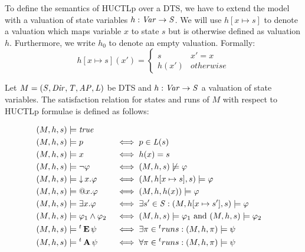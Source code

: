 To define the semantics of \ac{HUCTLp} over a \ac{DTS}, we have to extend the model with a valuation of state variables $h : \mathit{Var} \to \mathit{S}$. We will use $h[x \mapsto s]$ to denote a valuation which maps variable $x$ to state $s$ but is otherwise defined as valuation $h$. Furthermore, we write $h_0$ to denote an empty valuation. Formally:
\[
	h[x \mapsto s](x') = \begin{cases}
		s & x' = x \\
		h(x') & otherwise
	\end{cases}
\]

Let $M = (\mathit{S}, \mathit{Dir}, \mathit{T}, \mathit{AP}, \mathit{L})$ be \ac{DTS} and $h : \mathit{Var} \to \mathit{S}$ a valuation of state variables. The satisfaction relation for states and runs of $M$ with respect to \ac{HUCTLp} formulae is defined as follows:

\begin{alignat*}{2}
	(M,h,s) &\models \mathit{true}	\\
	(M,h,s) &\models p										   && \iff p \in \mathit{L}(s) \\
	(M,h,s) &\models x										   && \iff h(x) = s \\
	(M,h,s) &\models \neg \varphi  						  && \iff (M, h,s) \not\models \varphi \\
	(M,h,s) &\models \operatorname{\downarrow} x. \varphi 			   && \iff (M,h[x \mapsto s], s) \models \varphi \\
	(M,h,s) &\models \operatorname{@\!} x. \varphi 				&& \iff (M,h,h(x)) \models \varphi \\
	(M,h,s) &\models \exists x. \varphi 		  && \iff \exists s' \in \mathit{S} :  (M,h[x \mapsto s'], s) \models \varphi \\	
	(M,h,s) &\models \varphi_1 \land \varphi_2 	   && \iff (M,h,s) \models \varphi_1 \text{ and } (M,h,s) \models \varphi_2  \\
	(M,h,s) &\models {}^{t}\operatorname{\mathbf{E}} \psi 			 && \iff \exists \pi \in {}^{t}runs : (M,h,\pi) \models \psi \\
	(M,h,s) &\models {}^{t}\operatorname{\mathbf{A}} \psi 			 && \iff \forall \pi \in {}^{t}runs : (M,h,\pi) \models \psi \\	
\end{alignat*}

